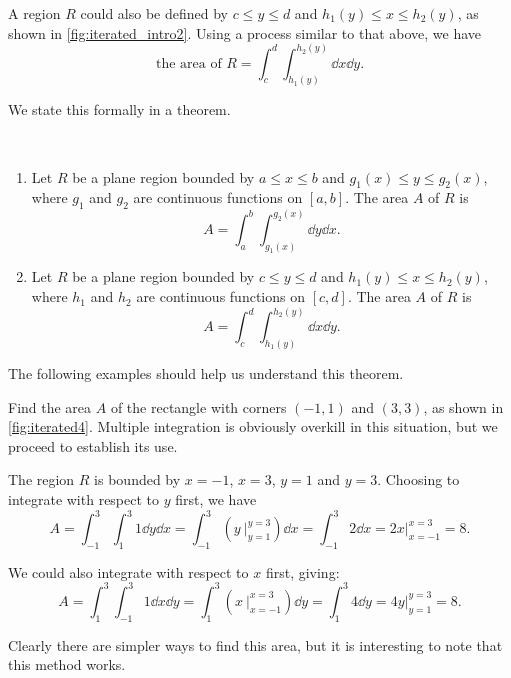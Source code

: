 A region $R$ could also be defined by $c\leq y\leq d$ and $h_1(y)\leq x\leq h_2(y)$, as shown in \autoref{fig:iterated_intro2}. Using a process similar to that above, we have 
\[\text{the area of }R = \int_c^d\int_{h_1(y)}^{h_2(y)} \dd x\dd y.\]

We state this formally in a theorem.

\begin{theorem}\label{thm:area_plane_region}%
\mbox{}\\[-2\baselineskip]\parbox[t]{\linewidth}{%
\begin{enumerate}
	\item Let $R$ be a plane region bounded by $a\leq x\leq b$ and $g_1(x)\leq y\leq g_2(x)$, where $g_1$ and $g_2$ are continuous functions on $[a,b]$. The area $A$ of $R$ is
	\[A = \int_a^b\int_{g_1(x)}^{g_2(x)} \dd y\dd x.\]
	\item Let $R$ be a plane region bounded by $c\leq y\leq d$ and $h_1(y)\leq x\leq h_2(y)$, where $h_1$ and $h_2$ are continuous functions on $[c,d]$. The area $A$ of $R$ is
	\[A = \int_c^d\int_{h_1(y)}^{h_2(y)} \dd x\dd y.\]
\end{enumerate}}
\end{theorem}

The following examples should help us understand this theorem.

\begin{example}\label{ex_iterated4}%
Find the area $A$ of the rectangle with corners $(-1,1)$ and $(3,3)$, as shown in \autoref{fig:iterated4}.
\solution
Multiple integration is obviously overkill in this situation, but we proceed to establish its use.


The region $R$ is bounded by $x=-1$, $x=3$, $y=1$ and $y=3$. Choosing to integrate with respect to $y$ first, we have 
\[
 A = \int_{-1}^3\int_1^3 1\dd y\dd x
 = \int_{-1}^3 \left(y\ \Big|_{y=1}^{y=3}\right)\dd x
 = \int_{-1}^3 2\dd x = 2x\Big|_{x=-1}^{x=3}=8.
\]

We could also integrate with respect to $x$ first, giving:
\[
 A = \int_1^3\int_{-1}^3 1\dd x \dd y
 =\int_1^3 \left(x\ \Big|_{x=-1}^{x=3}\right)\dd y
 = \int_1^3 4\dd y = 4y\Big|_{y=1}^{y=3} = 8.
\]

Clearly there are simpler ways to find this area, but it is interesting to note that this method works.
\end{example}

